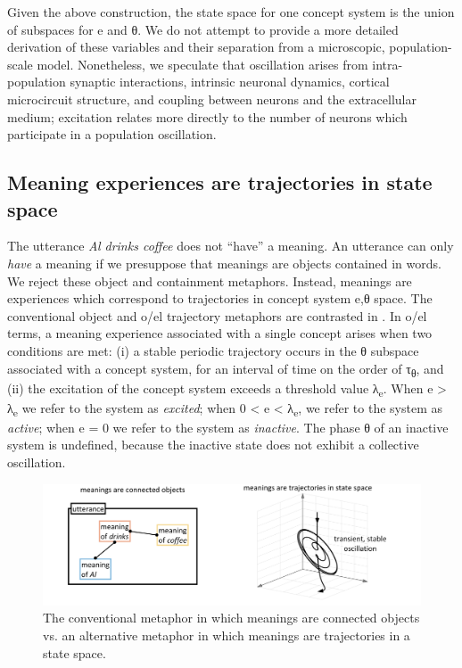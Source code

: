   Given the above construction, the state space for one concept system is the union of subspaces for e and θ. We do not attempt to provide a more detailed derivation of these variables and their separation from a microscopic, population-scale model. Nonetheless, we speculate that oscillation arises from intra-population synaptic interactions, intrinsic neuronal dynamics, cortical microcircuit structure, and coupling between neurons and the extracellular medium; excitation relates more directly to the number of neurons which participate in a population oscillation.  

\subsection{Meaning experiences are trajectories in state space}

The utterance \textit{Al drinks coffee} does not “have” a meaning. An utterance can only \textit{have} a meaning if we presuppose that meanings are objects contained in words. We reject these object and containment metaphors. Instead, meanings are experiences which correspond to trajectories in concept system e,θ space. The conventional object and o/el trajectory metaphors are contrasted in {}. In o/el terms, a meaning experience associated with a single concept arises when two conditions are met: (i) a stable periodic trajectory occurs in the θ subspace associated with a concept system, for an interval of time on the order of τ\textsubscript{θ}, and (ii) the excitation of the concept system exceeds a threshold value λ\textsubscript{e}. When e > λ\textsubscript{e} we refer to the system as \textit{excited}; when 0 < e < λ\textsubscript{e}, we refer to the system as \textit{active}; when e = 0 we refer to the system as \textit{inactive}. The phase θ of an inactive system is undefined, because the inactive state does not exhibit a collective oscillation. 

  
\begin{figure}
\includegraphics[width=\textwidth]{figures/Tilsen-img13.png}
\caption{The conventional metaphor in which meanings are connected objects vs. an alternative metaphor in which meanings are trajectories in a state space.}
\label{fig:2:6}
\end{figure}
 

